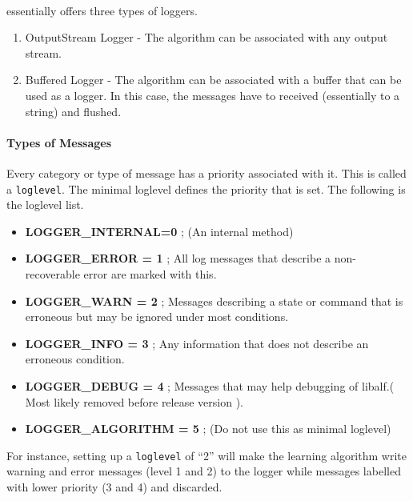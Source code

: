 \paragraph{}
\libalf essentially offers three types of loggers. 
\begin{enumerate}
 \item OutputStream Logger - The algorithm can be associated with any output stream.
 \item Buffered Logger - The algorithm can be associated with a buffer that can be used as a logger. In this case, the messages have to received (essentially to a string) and flushed.
\end{enumerate}
\paragraph{Types of Messages}
Every category or type of message has a priority associated with it. This is called a \texttt{loglevel}. The minimal loglevel defines the priority that is set. The following is the loglevel list. 
\begin{itemize}
 \item \textbf{LOGGER\_INTERNAL=0} ; (An internal method)
 \item \textbf{LOGGER\_ERROR = 1} ; All log messages that describe a non-recoverable error are marked with this.
 \item \textbf{LOGGER\_WARN = 2} ; Messages describing a state or command that is erroneous but may be ignored under most conditions.
 \item \textbf{LOGGER\_INFO = 3} ; Any information that does not describe an erroneous condition.
 \item \textbf{LOGGER\_DEBUG = 4} ; Messages that may help debugging of libalf.( Most likely removed before release version ).
 \item \textbf{LOGGER\_ALGORITHM = 5} ; (Do not use this as minimal loglevel)
\end{itemize}
For instance, setting up a \texttt{loglevel} of ``2'' will make the learning algorithm write warning and error messages (level 1 and 2) to the logger while messages labelled with lower priority (3 and 4) and discarded.

